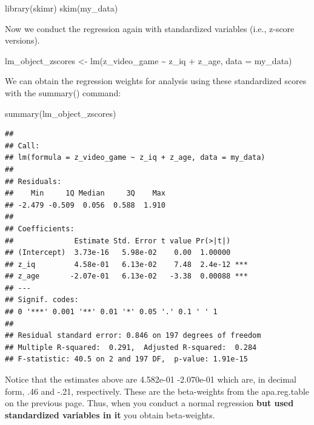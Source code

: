 \documentclass[
]{krantz}
\makeatletter
\newenvironment{Shaded}{\begin{snugshade}}{\end{snugshade}}
\newcommand{\AttributeTok}[1]{\textcolor[rgb]{0.61,0.61,0.61}{#1}}
\newcommand{\FunctionTok}[1]{\textcolor[rgb]{0,0,0}{#1}}
\newcommand{\NormalTok}[1]{#1}
\newcommand{\OtherTok}[1]{\textcolor[rgb]{0.37,0.37,0.37}{#1}}
\newcommand{\SpecialCharTok}[1]{\textcolor[rgb]{0,0,0}{#1}}
\newenvironment{kframe}{%
\medskip{}
\setlength{\fboxsep}{.8em}
 \def\at@end@of@kframe{}%
 \ifinner\ifhmode%
  \def\at@end@of@kframe{\end{minipage}}%
  \begin{minipage}{\columnwidth}%
 \fi\fi%
 \def\FrameCommand##1{\hskip\@totalleftmargin \hskip-\fboxsep
 \colorbox{shadecolor}{##1}\hskip-\fboxsep
     \hskip-\linewidth \hskip-\@totalleftmargin \hskip\columnwidth}%
 \MakeFramed {\advance\hsize-\width
   \@totalleftmargin\z@ \linewidth\hsize
   \@setminipage}}%
 {\par\unskip\endMakeFramed%
 \at@end@of@kframe}
\renewenvironment{Shaded}{\begin{kframe}}{\end{kframe}}
\makeatother
\begin{document}
\begin{Shaded}
\begin{Highlighting}[]
\FunctionTok{library}\NormalTok{(skimr)}
\FunctionTok{skim}\NormalTok{(my\_data)}
\end{Highlighting}
\end{Shaded}

Now we conduct the regression again with standardized variables (i.e., z-score versions).

\begin{Shaded}
\begin{Highlighting}[]
\NormalTok{lm\_object\_zscores }\OtherTok{\textless{}{-}} \FunctionTok{lm}\NormalTok{(z\_video\_game }\SpecialCharTok{\textasciitilde{}}\NormalTok{ z\_iq }\SpecialCharTok{+}\NormalTok{ z\_age,}
                        \AttributeTok{data =}\NormalTok{ my\_data)}
\end{Highlighting}
\end{Shaded}

We can obtain the regression weights for analysis using these standardized scores with the summary() command:

\begin{Shaded}
\begin{Highlighting}[]
\FunctionTok{summary}\NormalTok{(lm\_object\_zscores) }
\end{Highlighting}
\end{Shaded}

\begin{verbatim}
## 
## Call:
## lm(formula = z_video_game ~ z_iq + z_age, data = my_data)
## 
## Residuals:
##    Min     1Q Median     3Q    Max 
## -2.479 -0.509  0.056  0.588  1.910 
## 
## Coefficients:
##              Estimate Std. Error t value Pr(>|t|)    
## (Intercept)  3.73e-16   5.98e-02    0.00  1.00000    
## z_iq         4.58e-01   6.13e-02    7.48  2.4e-12 ***
## z_age       -2.07e-01   6.13e-02   -3.38  0.00088 ***
## ---
## Signif. codes:  
## 0 '***' 0.001 '**' 0.01 '*' 0.05 '.' 0.1 ' ' 1
## 
## Residual standard error: 0.846 on 197 degrees of freedom
## Multiple R-squared:  0.291,  Adjusted R-squared:  0.284 
## F-statistic: 40.5 on 2 and 197 DF,  p-value: 1.91e-15
\end{verbatim}

Notice that the estimates above are 4.582e-01 -2.070e-01 which are, in decimal form, .46 and -.21, respectively. These are the beta-weights from the apa.reg.table on the previous page. Thus, when you conduct a normal regression \textbf{but used standardized variables in it} you obtain beta-weights.
\end{document}
